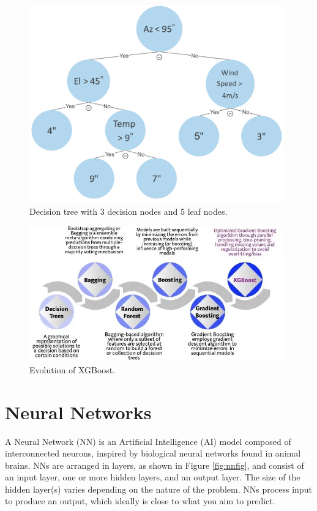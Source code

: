 \begin{figure}[H]
    \centering
    \includegraphics[width=0.98\textwidth]{Other figures/decisiontree_example.PNG}
    \caption{Decision tree with 3 decision nodes and 5 leaf nodes.}
    \label{fig:decitiontree}
\end{figure}

\begin{figure}[H]
    \centering
    \includegraphics[width=0.98\textwidth]{Other figures/evolution_of_xgb.png}
    \caption{Evolution of XGBoost.
\cite{morde_vishal_nodate}}
    \label{fig:evolution_of_xgb}
\end{figure}

\section{Neural Networks}
A Neural Network (NN) is an Artificial Intelligence (AI) model composed of interconnected neurons, inspired by biological neural networks found in animal brains.
NNs are arranged in layers, as shown in Figure \ref{fig:nnfig}, and consist of an input layer, one or more hidden layers, and an output layer.
The size of the hidden layer(s) varies depending on the nature of the problem.
NNs process input to produce an output, which ideally is close to what you aim to predict.

